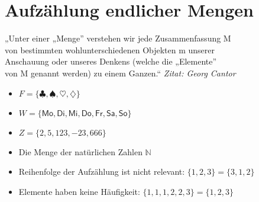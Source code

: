 \documentclass{article}
\begin{document}
\large
\section*{Aufzählung endlicher Mengen}
\begin{center}
    „Unter einer „Menge” verstehen wir jede Zusammenfassung M \\
    von bestimmten wohlunterschiedenen Objekten m unserer \\
    Anschauung oder unseres Denkens (welche die „Elemente” \\
    von M genannt werden) zu einem Ganzen.“
    \textit{Zitat: Georg Cantor}
\end{center}

\begin{exampleBox}[Mengen]
	\begin{itemize}[label=]
		\item $F = \{\clubsuit, \spadesuit, \heartsuit, \diamondsuit\}$
		\item $W = \{\mathsf{Mo}, \mathsf{Di}, \mathsf{Mi}, \mathsf{Do}, \mathsf{Fr}, \mathsf{Sa}, \mathsf{So}\}$
		\item $Z = \{2, 5, 123, -23, 666\}$
		\item Die Menge der natürlichen Zahlen $\mathbb{N}$ 
	\end{itemize}
\end{exampleBox}
\begin{noteBox}
    \begin{itemize}[label=]
        \item Reihenfolge der Aufzählung ist nicht relevant: $\{1,2,3\} = \{3,1,2\}$
        \item Elemente haben keine Häufigkeit: $\{1,1,1,2,2,3\} = \{1,2,3\}$
    \end{itemize}
\end{noteBox}
\end{document}
